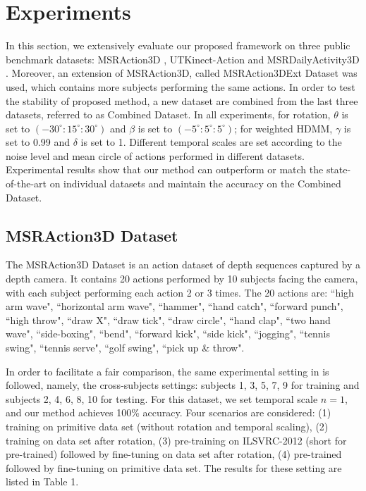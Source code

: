 \documentclass[conference]{IEEEtran}
\begin{document}
\section{Experiments}
In this section, we extensively evaluate our proposed framework on three public benchmark datasets: MSRAction3D \cite{Li2010}, UTKinect-Action \cite{xia2012view} and MSRDailyActivity3D \cite{wang2012mining}. Moreover, an extension of MSRAction3D, called MSRAction3DExt Dataset was used, which contains more subjects performing the same actions. In order to test the stability of proposed method, a new dataset are combined from the last three datasets, referred to as Combined Dataset. In all experiments, for rotation, $\theta$ is set to $(-30^{\circ}:15^{\circ}:30^{\circ})$ and $\beta$ is set to $(-5^{\circ}:5^{\circ}:5^{\circ})$; for weighted HDMM, $\gamma$ is set to 0.99 and $\delta$ is set to 1. Different temporal scales are set according to the noise level and mean circle of actions performed in different datasets. Experimental results show that our method can outperform or match the state-of-the-art on individual datasets and maintain the accuracy on the Combined Dataset.


 
\subsection{MSRAction3D Dataset}
The MSRAction3D Dataset \cite{Li2010} is an action dataset of depth sequences captured by a depth camera. It contains 20 actions performed by 10 subjects facing the camera, with each subject performing each action 2 or 3 times. The 20 actions are: ``high arm wave", ``horizontal arm wave", ``hammer", ``hand catch", ``forward punch", ``high throw", ``draw X", ``draw tick", ``draw circle", ``hand clap", ``two hand wave", ``side-boxing", ``bend", ``forward kick", ``side kick", ``jogging", ``tennis swing", ``tennis serve", ``golf swing", ``pick up \& throw".

In order to facilitate a fair comparison, the same experimental setting in \cite{wang2012mining} is followed, namely, the cross-subjects settings: subjects 1, 3, 5, 7, 9 for training and subjects 2, 4, 6, 8, 10 for testing. For this dataset, we set temporal scale $n = 1$, and our method achieves 100\% accuracy. Four scenarios are considered: (1) training on primitive data set (without rotation and temporal scaling), (2) training on data set after rotation, (3) pre-training on ILSVRC-2012 (short for pre-trained) followed by fine-tuning on data set after rotation, (4) pre-trained followed by fine-tuning on primitive data set. The results for these setting are listed in Table 1.
\end{document}
